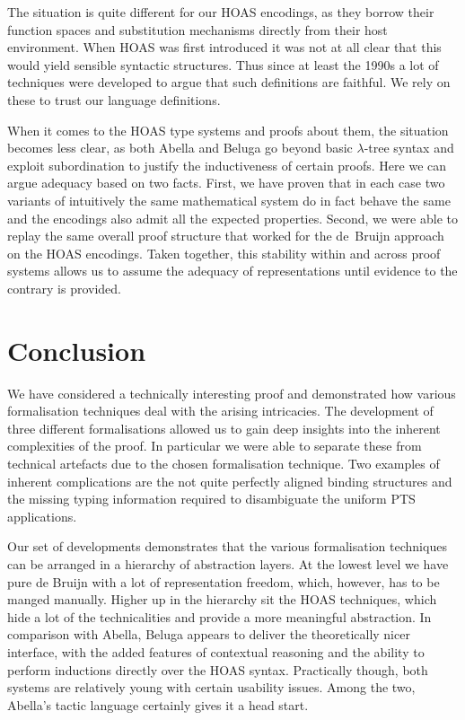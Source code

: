 \documentclass[a4paper,UKenglish]{lipics-v2016}
\theoremstyle{plain}
\begin{document}
The situation is quite different for our HOAS encodings, as they borrow their function spaces and substitution mechanisms directly from their host environment.
When HOAS was first introduced it was not at all clear that this would yield sensible syntactic structures.
Thus since at least the 1990s a lot of techniques were developed to argue that such definitions are faithful.
We rely on these to trust our language definitions.

When it comes to the HOAS type systems and proofs about them, the situation becomes less clear, as both Abella and Beluga go beyond basic $\lambda$-tree syntax and exploit subordination to justify the inductiveness of certain proofs.
Here we can argue adequacy based on two facts.
First, we have proven that in each case two variants of intuitively the same mathematical system do in fact behave the same and the encodings also admit all the expected properties.
Second, we were able to replay the same overall proof structure that worked for the de~Bruijn approach on the HOAS encodings.
Taken together, this stability within and across proof systems allows us to assume the adequacy of representations until evidence to the contrary is provided.

\section{Conclusion}
\label{sec:conclusion}

We have considered a technically interesting proof and demonstrated how various formalisation techniques deal with the arising intricacies.
The development of three different formalisations allowed us to gain deep insights into the inherent complexities of the proof.
In particular we were able to separate these from technical artefacts due to the chosen formalisation technique.
Two examples of inherent complications are the not quite perfectly aligned binding structures and the missing typing information required to disambiguate the uniform PTS applications.

Our set of developments demonstrates that the various formalisation techniques can be arranged in a hierarchy of abstraction layers.
At the lowest level we have pure de Bruijn with a lot of representation freedom, which, however, has to be manged manually.
Higher up in the hierarchy sit the HOAS techniques, which hide a lot of the technicalities and provide a more meaningful abstraction.
In comparison with Abella, Beluga appears to deliver the theoretically nicer interface, with the added features of contextual reasoning and the ability to perform inductions directly over the HOAS syntax.
Practically though, both systems are relatively young with certain usability issues.
Among the two, Abella's tactic language certainly gives it a head start.
\end{document}
